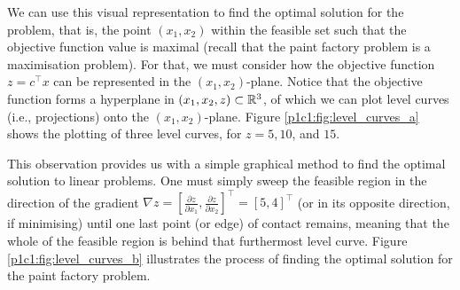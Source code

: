We can use this visual representation to find the optimal solution for the problem, that is, the point $(x_1,x_2)$ within the feasible set such that the objective function value is maximal (recall that the paint factory problem is a maximisation problem). For that, we must consider how the objective function $z = c^\top x$ can be represented in the $(x_1, x_2)$-plane. Notice that the objective function forms a hyperplane in $(x_1, x_2, z) \subset \mathbb{R}^3$, of which we can plot level curves (i.e., projections) onto the $(x_1, x_2)$-plane. Figure \ref{p1c1:fig:level_curves_a} shows the plotting of three level curves, for $z= 5, 10$, and $15$. 

This observation provides us with a simple graphical method to find the optimal solution to linear problems. One must simply sweep the feasible region in the direction of the gradient $\nabla z=[\frac{\partial z}{\partial x_1},\frac{\partial z}{\partial x_2}]^\top=[5,4]^\top$ (or in its opposite direction, if minimising) until one last point (or edge) of contact remains, meaning that the whole of the feasible region is behind that furthermost level curve. Figure \ref{p1c1:fig:level_curves_b} illustrates the process of finding the optimal solution for the paint factory problem.

